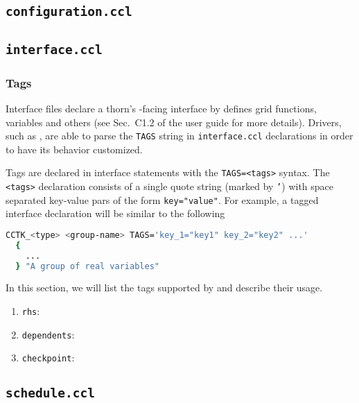 \subsection{\texttt{configuration.ccl}}


\subsection{\texttt{interface.ccl}}

\subsubsection{Tags}

Interface files declare a thorn's \Cactus-facing interface by defines grid functions, variables and others (see Sec.~C1.2 of the \Cactus user guide for more details). Drivers, such as \CarpetX, are able to parse the \texttt{TAGS} string in \texttt{interface.ccl} declarations in order to have its behavior customized.

Tags are declared in interface statements with the \texttt{TAGS=<tags>} syntax. The \texttt{<tags>} declaration consists of a single quote string (marked by \texttt{'}) with space separated key-value pars of the form \texttt{key="value"}. For example, a tagged interface declaration will be similar to the following
%
\begin{lstlisting}[language=bash]
  CCTK_<type> <group-name> TAGS='key_1="key1" key_2="key2" ...'
  {
    ...
  } "A group of real variables"
\end{lstlisting}

In this section, we will list the tags supported by \CarpetX\space and describe their usage.

\begin{enumerate}
  \item \texttt{rhs}:
  \item \texttt{dependents}:
  \item \texttt{checkpoint}:
\end{enumerate}

\subsection{\texttt{schedule.ccl}}



